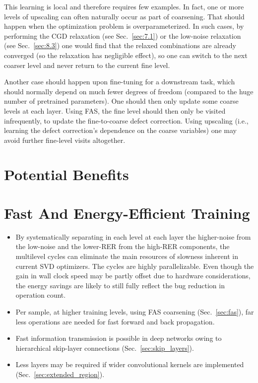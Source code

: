 \documentclass{article} %
\begin{document}
This learning is local and therefore requires few examples. In fact, one or more levels of upscaling can often naturally occur as part of coarsening. That should happen when the optimization problem is overparameterized. In such cases, by performing the CGD relaxation (see Sec.~\ref{sec:7.1}) or the low-noise relaxation (see Sec.~\ref{sec:8.3}) one would find that the relaxed combinations are already converged (so the relaxation has negligible effect), so one can switch to the next coarser level and never return to the current fine level.

Another case should happen upon fine-tuning for a downstream task, which should normally depend on much fewer degrees of freedom (compared to the huge number of pretrained parameters). One should then only update some coarse levels at each layer. Using FAS, the fine level should then only be visited infrequently, to update the fine-to-coarse defect correction. Using upscaling (i.e., learning the defect correction's dependence on the coarse variables) one may avoid further fine-level visits altogether.



\section{Potential Benefits}
\label{sec:benefits}

\section{Fast And Energy-Efficient Training}
\label{sec:fast_training}
\begin{itemize}
    \item By systematically separating in each level at each layer the higher-noise from the low-noise and the lower-RER from the high-RER components, the multilevel cycles can eliminate the main resources of slowness inherent in current SVD optimizers. The cycles are highly parallelizable. Even though the gain in wall clock speed may be partly offset due to hardware considerations, the energy savings are likely to still fully reflect the bug reduction in operation count.
    \item Per sample, at higher training levels, using FAS coarsening (Sec.~\ref{sec:fas}), far less operations are needed for fast forward and back propagation.
    \item Fast information transmission is possible in deep networks owing to hierarchical skip-layer connections (Sec.~\ref{sec:skip_layers}).
    \item Less layers may be required if wider convolutional kernels are implemented (Sec.~\ref{sec:extended_region}).
\end{itemize}
\end{document}
